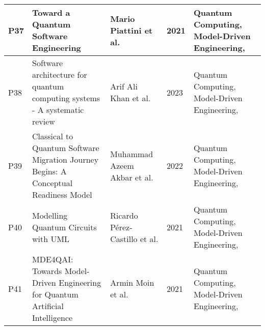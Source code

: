 \begin{longtable}{|m{0.8cm}|m{4.4cm}|m{3cm}|m{0.8cm}|m{4cm}|}
    P37 & Toward a Quantum Software Engineering & Mario Piattini et al. \cite{Piattini_2021} & 2021 & Quantum Computing, Model-Driven Engineering,  \\ \hline
    P38 & Software architecture for quantum computing systems - A systematic review & Arif Ali Khan et al. \cite{khan2023software} & 2023 & Quantum Computing, Model-Driven Engineering,  \\ \hline
    P39 & Classical to Quantum Software Migration Journey Begins: A Conceptual Readiness Model & Muhammad Azeem Akbar et al. \cite{Akbar_2022} & 2022 & Quantum Computing, Model-Driven Engineering,  \\ \hline
    P40 & Modelling Quantum Circuits with UML & Ricardo Pérez‐Castillo et al. \cite{Perez-Castillo_2021} & 2021 & Quantum Computing, Model-Driven Engineering,  \\ \hline
    P41 & MDE4QAI: Towards Model-Driven Engineering for Quantum Artificial Intelligence & Armin Moin et al. \cite{Moin_2021} & 2021 & Quantum Computing, Model-Driven Engineering,  \\ \hline
\end{longtable}

